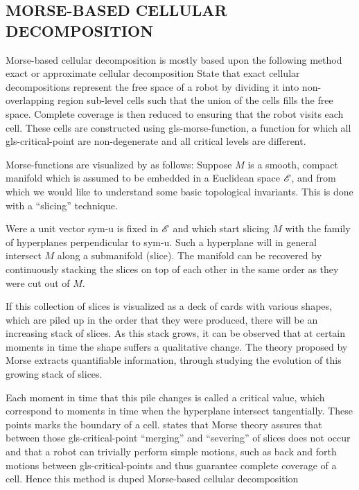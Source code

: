 \subsection{MORSE-BASED CELLULAR DECOMPOSITION}
Morse-based cellular decomposition is mostly based upon the following method exact or approximate cellular
decomposition \citet{acar_morse_2002} State that exact cellular decompositions represent the free space
of a robot by dividing it into non-overlapping region sub-level cells such that the union of the cells fills the free
space. Complete coverage is then reduced to ensuring that the robot visits each cell. These cells are constructed using
\gls{gls-morse-function}, a function for which all \gls{gls-critical-point} are non-degenerate and all critical levels
are different.

Morse-functions are visualized by \citet{nicolaescu_invitation_2007} as follows: Suppose \( M \) is a smooth, compact
manifold which is  assumed to be embedded in a Euclidean space \( \operatorname{\mathscr{E}} \), and from which we would like to understand
some basic topological invariants. This is done with a ``slicing'' technique.

Were a unit vector \gls{sym-u} is fixed in \( \operatorname{\mathscr{E}} \) and which start slicing \( M \) with the family of hyperplanes
perpendicular to  \gls{sym-u}. Such a hyperplane will in general intersect \( M \) along a submanifold (slice). The
manifold can be recovered by continuously stacking the slices on top of each other in the same order as they were cut
out of \( M \).

If this collection of slices is visualized as a deck of cards with various shapes, which are piled up in the order that
they were produced, there will be an increasing stack of slices. As this stack grows, it can be observed that at certain
moments in time the shape suffers a qualitative change. The theory proposed by Morse extracts quantifiable information,
through studying the evolution of this growing stack of slices.

Each moment in time that this pile changes is called a critical value, which correspond to moments in time when the
hyperplane intersect tangentially. These points marks the boundary of a cell. \citet{acar_morse_2002} states that Morse
theory assures that between those \gls{gls-critical-point} ``merging'' and ``severing'' of slices does not occur and
that a robot can trivially perform simple motions, such as back and forth motions between \gls{gls-critical-point}s and
thus guarantee complete coverage of a cell. Hence this method is duped Morse-based cellular decomposition


